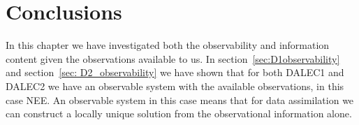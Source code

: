 \documentclass[11pt]{article}
\begin{document}



\section{Conclusions}

In this chapter we have investigated both the observability and information content given the observations available to us. In section~\ref{sec:D1observability} and section~\ref{sec: D2_observability} we have shown that for both DALEC1 and DALEC2 we have an observable system with the available observations, in this case NEE. An observable system in this case means that for data assimilation we can construct a locally unique solution from the observational information alone. 
\end{document}
